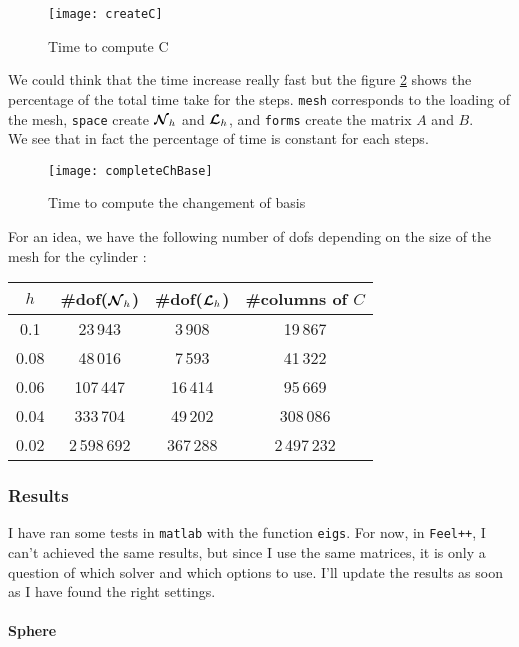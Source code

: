 \begin{figure}[H]
  \centering
  \texttt{[image: createC]}
  \caption{Time to compute C}
  \label{timeC}
\end{figure}

We could think that the time increase really fast but the figure \ref{completeTime} shows the percentage of the total time take for the steps. \texttt{mesh} corresponds to the loading of the mesh, \texttt{space} create ${\bm{\mathcal{N}}}_h$ and ${\bm{\mathcal{L}}}_h$, and \texttt{forms} create the matrix $A$ and $B$.\\
We see that in fact the percentage of time is constant for each steps.

\begin{figure}[H]
  \centering
  \texttt{[image: completeChBase]}
  \caption{Time to compute the changement of basis}
  \label{completeTime}
\end{figure}

For an idea, we have the following number of dofs depending on the size of the mesh for the cylinder :
\begin{center}
  \begin{tabular}{ c | c | c | c }
    $h$ & \#dof(${\bm{\mathcal{N}}}_h$) & \#dof(${\bm{\mathcal{L}}}_h$) & \#columns of $C$ \\ \hline
    0.1 & 23\,943 & 3\,908 & 19\,867 \\ \hline
    0.08 & 48\,016 & 7\,593 & 41\,322 \\ \hline
    0.06 & 107\,447 & 16\,414 & 95\,669 \\ \hline
    0.04 & 333\,704 & 49\,202 & 308\,086 \\ \hline
    0.02 & 2\,598\,692 & 367\,288 & 2\,497\,232 \\ \hline
  \end{tabular}
\end{center}

\subsubsection{Results}

I have ran some tests in \texttt{matlab} with the function \texttt{eigs}. For now, in \texttt{Feel++}, I can't achieved the same results, but since I use the same matrices, it is only a question of which solver and which options to use. I'll update the results as soon as I have found the right settings.\\

\paragraph{Sphere}

